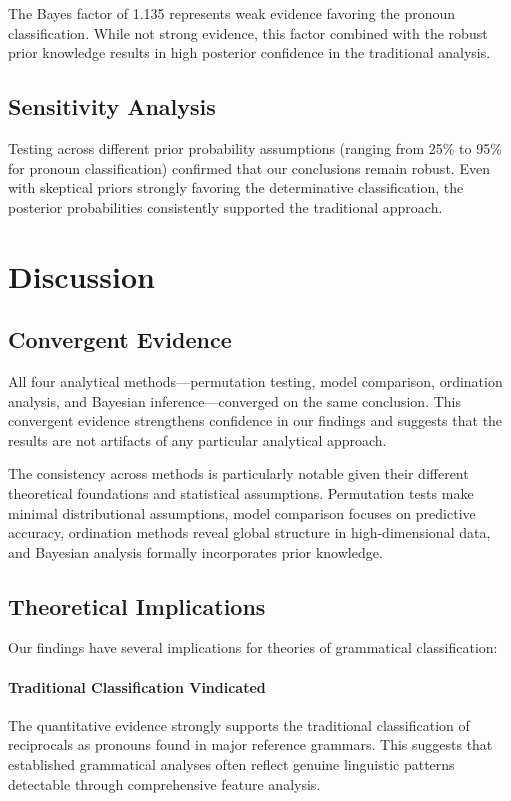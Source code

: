 \documentclass[12pt]{article}
\begin{document}
The Bayes factor of 1.135 represents weak evidence favoring the pronoun classification. While not strong evidence, this factor combined with the robust prior knowledge results in high posterior confidence in the traditional analysis.

\subsection{Sensitivity Analysis}

Testing across different prior probability assumptions (ranging from 25\% to 95\% for pronoun classification) confirmed that our conclusions remain robust. Even with skeptical priors strongly favoring the determinative classification, the posterior probabilities consistently supported the traditional approach.

\section{Discussion}

\subsection{Convergent Evidence}

All four analytical methods—permutation testing, model comparison, ordination analysis, and Bayesian inference—converged on the same conclusion. This convergent evidence strengthens confidence in our findings and suggests that the results are not artifacts of any particular analytical approach.

The consistency across methods is particularly notable given their different theoretical foundations and statistical assumptions. Permutation tests make minimal distributional assumptions, model comparison focuses on predictive accuracy, ordination methods reveal global structure in high-dimensional data, and Bayesian analysis formally incorporates prior knowledge.

\subsection{Theoretical Implications}

Our findings have several implications for theories of grammatical classification:

\paragraph{Traditional Classification Vindicated}
The quantitative evidence strongly supports the traditional classification of reciprocals as pronouns found in major reference grammars. This suggests that established grammatical analyses often reflect genuine linguistic patterns detectable through comprehensive feature analysis.
\end{document}
